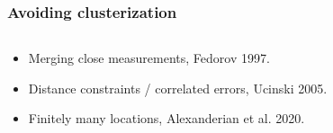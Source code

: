 \documentclass{beamer}
\begin{document}
\begin{frame}
  \frametitle{Avoiding clusterization}

  \begin{columns}
    \begin{column}{0.6\textwidth}
      \begin{itemize}
      \item<1> Merging close measurements, {\tiny Fedorov 1997}.
      \item<2> Distance constraints / correlated errors, {\tiny Ucinski 2005}.
      \item<3> Finitely many locations, {\tiny Alexanderian et al. 2020}.
      \end{itemize}
    \end{column}
    \begin{column}{0.55\textwidth}

\end{column}
\end{columns}
\end{frame}
\end{document}
